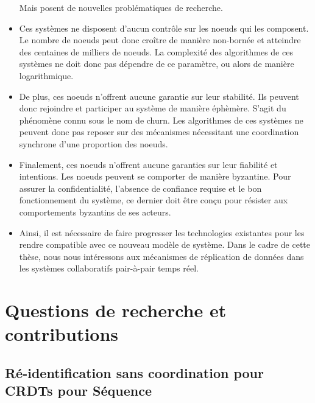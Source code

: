\documentclass[12pt]{thesul}
\theoremstyle{definition}
\begin{document}
\begin{itemize}
    Mais posent de nouvelles problématiques de recherche.
  \item Ces systèmes ne disposent d'aucun contrôle sur les noeuds qui les composent.
    Le nombre de noeuds peut donc croître de manière non-bornée et atteindre des centaines de milliers de noeuds.
    La complexité des algorithmes de ces systèmes ne doit donc pas dépendre de ce paramètre, ou alors de manière logarithmique.
  \item De plus, ces noeuds n'offrent aucune garantie sur leur stabilité.
    Ils peuvent donc rejoindre et participer au système de manière éphèmère.
    S'agit du phénomène connu sous le nom de churn.
    Les algorithmes de ces systèmes ne peuvent donc pas reposer sur des mécanismes nécessitant une coordination synchrone d'une proportion des noeuds.
  \item Finalement, ces noeuds n'offrent aucune garanties sur leur fiabilité et intentions.
    Les noeuds peuvent se comporter de manière byzantine.
    Pour assurer la confidentialité, l'absence de confiance requise et le bon fonctionnement du système, ce dernier doit être conçu pour résister aux comportements byzantins de ses acteurs.
  \item Ainsi, il est nécessaire de faire progresser les technologies existantes pour les rendre compatible avec ce nouveau modèle de système.
    Dans le cadre de cette thèse, nous nous intéressons aux mécanismes de réplication de données dans les systèmes collaboratifs pair-à-pair temps réel.
\end{itemize}

\section{Questions de recherche et contributions}

\subsection{Ré-identification sans coordination pour \acp{CRDT} pour Séquence}
\end{document}
